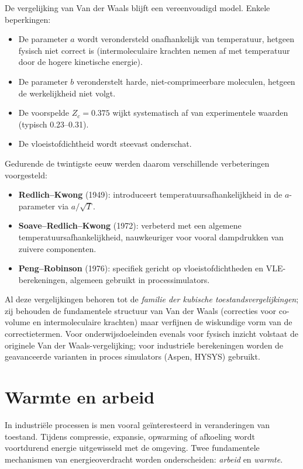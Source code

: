 De vergelijking van Van der Waals blijft een vereenvoudigd model. Enkele beperkingen:
\begin{itemize}
\item De parameter $a$ wordt verondersteld onafhankelijk van temperatuur, hetgeen fysisch niet correct is (intermoleculaire krachten nemen af met temperatuur door de hogere kinetische energie).
\item De parameter $b$ veronderstelt harde, niet-comprimeerbare moleculen, hetgeen de werkelijkheid niet volgt.
\item De voorspelde $Z_c = 0.375$ wijkt systematisch af van experimentele waarden (typisch 0.23--0.31).
\item De vloeistofdichtheid wordt steevast onderschat.
\end{itemize}
Gedurende de twintigste eeuw werden daarom verschillende verbeteringen voorgesteld:
\begin{itemize}
\item \textbf{Redlich--Kwong} (1949): introduceert temperatuursafhankelijkheid in de $a$-parameter via $a/\sqrt{T}$.
\item \textbf{Soave--Redlich--Kwong} (1972): verbeterd met een algemene temperatuursafhankelijkheid, nauwkeuriger voor vooral dampdrukken van zuivere componenten.
\item \textbf{Peng--Robinson} (1976): specifiek gericht op vloeistofdichtheden en VLE-berekeningen, algemeen gebruikt in processimulators.
\end{itemize}
Al deze vergelijkingen behoren tot de \emph{familie der kubische toestandsvergelijkingen}; zij behouden de fundamentele structuur van Van der Waals (correcties voor co-volume en intermoleculaire krachten) maar verfijnen de wiskundige vorm van de correctietermen. Voor onderwijsdoeleinden evenals voor fysisch inzicht volstaat de originele Van der Waals-vergelijking; voor industrie\"le berekeningen worden de geavanceerde varianten in proces simulators (Aspen, HYSYS) gebruikt.


\section{Warmte en arbeid}

In industri\"ele processen is men vooral ge\"interesteerd in veranderingen van toestand. Tijdens compressie, expansie, opwarming of afkoeling wordt voortdurend energie uitgewisseld met de omgeving. Twee fundamentele mechanismen van energieoverdracht worden onderscheiden: \emph{arbeid} en \emph{warmte}.

